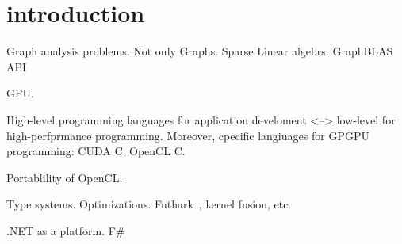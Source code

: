 \section{introduction}

Graph analysis problems. Not only Graphs. Sparse Linear algebrs. GraphBLAS API

GPU. 

High-level programming languages for application develoment <--> low-level for high-perfprmance programming.
Moreover, cpecific langiuages for GPGPU programming: CUDA C, OpenCL C.

Portablility of OpenCL.

Type systems. Optimizations. Futhark~\cite{Henriksen:2017:FPF:3062341.3062354}, kernel fusion, etc. 

.NET as a platform. F\#
